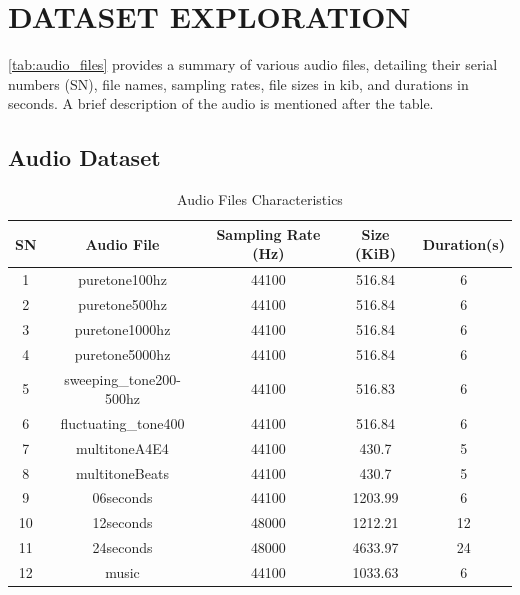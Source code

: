 \documentclass{ioereport}
\begin{document}
    \pagebreak


\section{\MakeUppercase{Dataset Exploration}}
\autoref{tab:audio_files} provides a summary of various audio files, detailing their serial numbers (SN), file names, sampling rates, file sizes in \gls{kib}, and durations in seconds. A brief description of the audio is mentioned after the table.

\subsection{Audio Dataset}
\begin{table}[H]
\centering
\caption{Audio Files Characteristics}
\label{tab:audio_files}
\begin{tabular}{|c|c|c|c|c|}
    \hline
    \textbf{SN} & \textbf{Audio File} & \textbf{Sampling Rate (Hz)} & \textbf{Size (KiB)} & \textbf{Duration(s)}\\
    \hline
    1 & puretone100hz & 44100 & 516.84 & 6 \\
    \hline
    2 & puretone500hz & 44100 & 516.84 & 6 \\
    \hline
    3 & puretone1000hz & 44100 & 516.84 & 6 \\
    \hline
    4 & puretone5000hz & 44100 & 516.84 & 6 \\
    \hline
    5 & sweeping\_tone200-500hz & 44100 & 516.83 & 6 \\
    \hline
    6 & fluctuating\_tone400 & 44100 & 516.84 & 6 \\
    \hline
    7 & multitoneA4E4 & 44100 & 430.7 & 5\\
    \hline
    8 & multitoneBeats & 44100 & 430.7 & 5\\ 
    \hline
    9 & 06seconds & 44100 & 1203.99 & 6\\
    \hline
    10 & 12seconds & 48000 & 1212.21 & 12\\
    \hline
    11 & 24seconds & 48000 & 4633.97 & 24  \\
    \hline
    12 & music & 44100 & 1033.63 & 6 \\
    \hline
\end{tabular}
\end{table}
\end{document}
